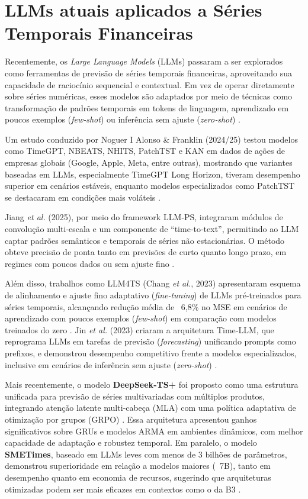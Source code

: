\section{LLMs atuais aplicados a Séries Temporais Financeiras}

Recentemente, os \emph{Large Language Models} (LLMs) passaram a ser explorados como ferramentas de previsão de séries temporais financeiras, aproveitando sua capacidade de raciocínio sequencial e contextual. Em vez de operar diretamente sobre séries numéricas, esses modelos são adaptados por meio de técnicas como transformação de padrões temporais em tokens de linguagem, aprendizado em poucos exemplos (\emph{few‑shot}) ou inferência sem ajuste (\emph{zero‑shot}) \cite{noguer2024llm_financial}.

Um estudo conduzido por Noguer I Alonso \& Franklin (2024/25) testou modelos como TimeGPT, NBEATS, NHITS, PatchTST e KAN em dados de ações de empresas globais (Google, Apple, Meta, entre outras), mostrando que variantes baseadas em LLMs, especialmente TimeGPT Long Horizon, tiveram desempenho superior em cenários estáveis, enquanto modelos especializados como PatchTST se destacaram em condições mais voláteis \cite{noguer2024llm_financial}.

Jiang \textit{et al.} (2025), por meio do framework LLM‑PS, integraram módulos de convolução multi‑escala e um componente de “time‑to‑text”, permitindo ao LLM captar padrões semânticos e temporais de séries não estacionárias. O método obteve precisão de ponta tanto em previsões de curto quanto longo prazo, em regimes com poucos dados ou sem ajuste fino \cite{tang2025llm_ps}.

Além disso, trabalhos como LLM4TS (Chang \textit{et al.}, 2023) apresentaram esquema de alinhamento e ajuste fino adaptativo (\textit{fine-tuning}) de LLMs pré‑treinados para séries temporais, alcançando redução média de ~6,8\% no MSE em cenários de aprendizado com poucos exemplos (\textit{few-shot}) em comparação com modelos treinados do zero \cite{chang2023llm4ts}. Jin \textit{et al.} (2023) criaram a arquitetura Time‑LLM, que reprograma LLMs em tarefas de previsão (\textit{forecasting}) unificando prompts como prefixos, e demonstrou desempenho competitivo frente a modelos especializados, inclusive em cenários de inferência sem ajuste (\textit{zero-shot}) \cite{jin2023time_llm}.

Mais recentemente, o modelo \textbf{DeepSeek‑TS+} foi proposto como uma estrutura unificada para previsão de séries multivariadas com múltiplos produtos, integrando atenção latente multi‑cabeça (MLA) com uma política adaptativa de otimização por grupos (GRPO) \cite{deepseek2025ts}. Essa arquitetura apresentou ganhos significativos sobre GRUs e modelos ARMA em ambientes dinâmicos, com melhor capacidade de adaptação e robustez temporal. Em paralelo, o modelo \textbf{SMETimes}, baseado em LLMs leves com menos de 3 bilhões de parâmetros, demonstrou superioridade em relação a modelos maiores (~7B), tanto em desempenho quanto em economia de recursos, sugerindo que arquiteturas otimizadas podem ser mais eficazes em contextos como o da B3 \cite{fan2025smetimes}.



